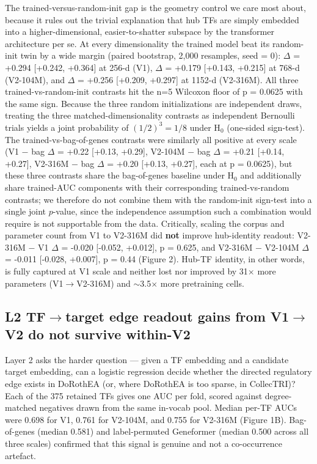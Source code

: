 \documentclass[10pt]{article}
\begin{document}
The trained-versus-random-init gap is the geometry control we care most
about, because it rules out the trivial explanation that hub TFs are
simply embedded into a higher-dimensional, easier-to-shatter subspace by
the transformer architecture per se. At every dimensionality the trained
model beat its random-init twin by a wide margin (paired bootstrap, 2,000 resamples, seed = 0): $\Delta$ = +0.294 {[}+0.242, +0.364{]} at 256-d (V1),
$\Delta$ = +0.179 {[}+0.143, +0.215{]} at 768-d (V2-104M),
and $\Delta$ = +0.256 {[}+0.209, +0.297{]} at 1152-d (V2-316M). All three
trained-vs-random-init contrasts hit the n=5 Wilcoxon floor of p = 0.0625
with the same sign. Because the three random initializations are
independent draws, treating the three matched-dimensionality contrasts as
independent Bernoulli trials yields a joint probability of $(1/2)^3 = 1/8$
under H$_0$ (one-sided sign-test). The trained-vs-bag-of-genes contrasts
were similarly all positive at every scale (V1 $-$ bag $\Delta$ = +0.22 {[}+0.13, +0.29{]},
V2-104M $-$ bag $\Delta$ = +0.21 {[}+0.14, +0.27{]}, V2-316M $-$ bag $\Delta$ = +0.20 {[}+0.13, +0.27{]}, each at p = 0.0625), but these three contrasts share the bag-of-genes baseline under H$_0$ and additionally share trained-AUC components with their corresponding trained-vs-random contrasts; we therefore do not combine them with the random-init sign-test into a single joint $p$-value, since the independence assumption such a combination would require is not supportable from the data. Critically, scaling the corpus
and parameter count from V1 to V2-316M did \textbf{not} improve
hub-identity readout: V2-316M $-$ V1 $\Delta$ = -0.020 {[}-0.052, +0.012{]}, p =
0.625, and V2-316M $-$ V2-104M $\Delta$ = -0.011 {[}-0.028, +0.007{]}, p = 0.44
(Figure 2). Hub-TF identity, in other words, is fully captured at V1
scale and neither lost nor improved by 31$\times$ more parameters (V1$\to$V2-316M) and $\sim$3.5$\times$ more
pretraining cells.

\subsection{L2 TF$\to$target edge readout gains from V1$\to$V2 do not
survive
within-V2}\label{l2-tftarget-edge-readout-gains-from-v1v2-do-not-survive-within-v2}

Layer 2 asks the harder question --- given a TF embedding and a
candidate target embedding, can a logistic regression decide whether the
directed regulatory edge exists in DoRothEA (or, where DoRothEA is too
sparse, in CollecTRI)? Each of the 375 retained TFs gives one AUC per
fold, scored against degree-matched negatives drawn from the same
in-vocab pool. Median per-TF AUCs were 0.698 for V1, 0.761 for V2-104M,
and 0.755 for V2-316M (Figure 1B). Bag-of-genes (median 0.581) and
label-permuted Geneformer (median 0.500 across all three scales)
confirmed that this signal is genuine and not a co-occurrence artefact.
\end{document}
